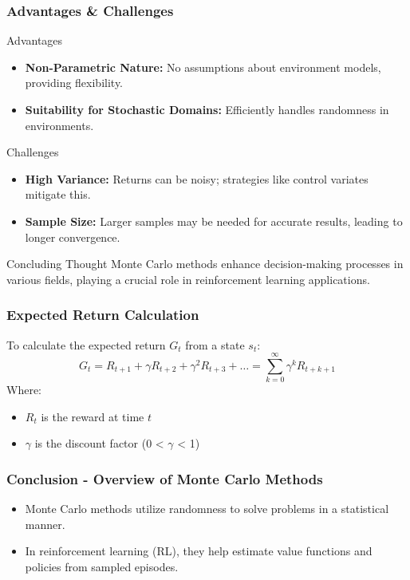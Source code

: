 \documentclass[aspectratio=169]{beamer}
\begin{document}
\begin{frame}[fragile]
    \frametitle{Advantages & Challenges}
    \begin{block}{Advantages}
        \begin{itemize}
            \item \textbf{Non-Parametric Nature:} No assumptions about environment models, providing flexibility.
            \item \textbf{Suitability for Stochastic Domains:} Efficiently handles randomness in environments.
        \end{itemize}
    \end{block}
    
    \begin{block}{Challenges}
        \begin{itemize}
            \item \textbf{High Variance:} Returns can be noisy; strategies like control variates mitigate this.
            \item \textbf{Sample Size:} Larger samples may be needed for accurate results, leading to longer convergence.
        \end{itemize}
    \end{block}
    
    \begin{block}{Concluding Thought}
        Monte Carlo methods enhance decision-making processes in various fields, playing a crucial role in reinforcement learning applications.
    \end{block}
\end{frame}

\begin{frame}[fragile]
    \frametitle{Expected Return Calculation}
    To calculate the expected return $G_t$ from a state $s_t$:
    \begin{equation}
        G_t = R_{t+1} + \gamma R_{t+2} + \gamma^2 R_{t+3} + \ldots = \sum_{k=0}^{\infty} \gamma^k R_{t+k+1}
    \end{equation}
    Where:
    \begin{itemize}
        \item $R_t$ is the reward at time $t$
        \item $\gamma$ is the discount factor (0 < $\gamma$ < 1)
    \end{itemize}
\end{frame}

\begin{frame}[fragile]
    \frametitle{Conclusion - Overview of Monte Carlo Methods}
    \begin{itemize}
        \item Monte Carlo methods utilize randomness to solve problems in a statistical manner.
        \item In reinforcement learning (RL), they help estimate value functions and policies from sampled episodes.
    \end{itemize}
\end{frame}
\end{document}
